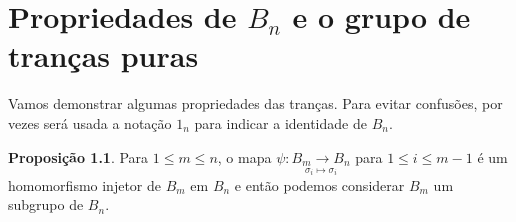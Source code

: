 \documentclass[a4paper,portuguese,11pt,twoside, leqno]{book}
\theoremstyle{definition}
\newtheorem{remark}{Observação}[section]
\newtheorem{prop}{Proposição}[section]
\begin{document}
	\chapter{Propriedades de $B_n$ e o grupo de tranças puras}
	
	\hspace{12pt} Vamos demonstrar algumas propriedades das tranças. Para evitar confusões, por vezes será usada a notação $1_n$ para indicar a identidade de $B_n$.
	
	
	
	
	
	\begin{prop}
		\label{B_m subgrupo de B_n}
		Para $1\leq m\leq n$, o mapa $\psi: \underset{\sigma_i\mapsto\sigma_i}{B_m\to B_n}$ para $1\leq i\leq m-1$ é um homomorfismo injetor de $B_m$ em $B_n$ e então podemos considerar $B_m$ um subgrupo de $B_n$. 
	\end{prop}
	
\end{document}
